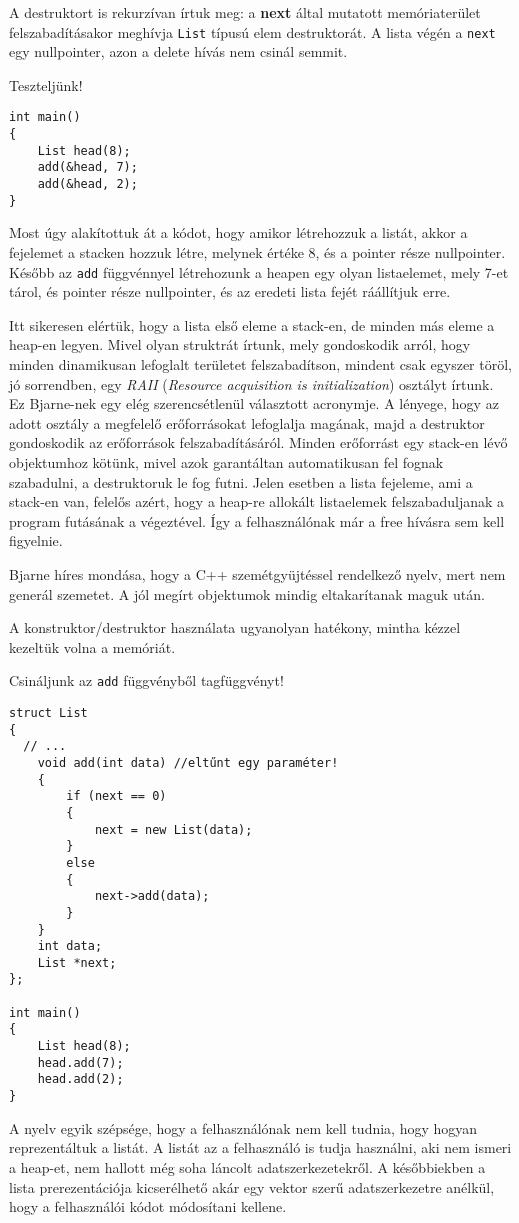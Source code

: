 \documentclass[a4paper,11.5pt,table]{article}
\begin{document}
	\medskip
	A destruktort is rekurzívan írtuk meg: a \textbf{next} által mutatott memóriaterület felszabadításakor meghívja \texttt{List} típusú elem destruktorát. A lista végén a \texttt{next} egy nullpointer, azon a delete hívás nem csinál semmit.
	
	\medskip
	Teszteljünk!
	\begin{lstlisting}
int main()
{
	List head(8);
	add(&head, 7);
	add(&head, 2);
}
	\end{lstlisting}
	Most úgy alakítottuk át a kódot, hogy amikor létrehozzuk a listát, akkor a fejelemet a stacken hozzuk létre, melynek értéke 8, és a pointer része nullpointer. Később az \texttt{add} függvénnyel létrehozunk a heapen egy olyan listaelemet, mely 7-et tárol, és pointer része nullpointer, és az eredeti lista fejét ráállítjuk erre.
	\medskip
	
	Itt sikeresen elértük, hogy a lista első eleme a stack-en, de minden más eleme a heap-en legyen. Mivel olyan struktrát írtunk, mely gondoskodik arról, hogy minden dinamikusan lefoglalt területet felszabadítson, mindent csak egyszer töröl, jó sorrendben, egy  \textit{RAII} (\textit{Resource acquisition is initialization}) osztályt írtunk. Ez Bjarne-nek egy elég szerencsétlenül választott acronymje. A lényege, hogy az adott osztály a megfelelő erőforrásokat lefoglalja magának, majd a destruktor gondoskodik az erőforrások felszabadításáról. Minden erőforrást egy stack-en lévő objektumhoz kötünk, mivel azok garantáltan automatikusan fel fognak szabadulni, a destruktoruk le fog futni. Jelen esetben a lista fejeleme, ami a stack-en van, felelős azért, hogy a heap-re allokált listaelemek felszabaduljanak a program futásának a végeztével. Így a felhasználónak már a free hívásra sem kell figyelnie.
	
	Bjarne híres mondása, hogy a C++ szemétgyüjtéssel rendelkező nyelv, mert nem generál szemetet. A jól megírt objektumok mindig eltakarítanak maguk után. 
	\medskip
	
	A konstruktor/destruktor használata ugyanolyan hatékony, mintha kézzel kezeltük volna a memóriát.
	
	\medskip
	Csináljunk az \texttt{add} függvényből tagfüggvényt!
	\begin{lstlisting}
struct List
{
  // ...	
	void add(int data) //eltűnt egy paraméter!
	{
		if (next == 0)
		{
			next = new List(data);
		}
		else
		{
			next->add(data);
		}
	}
	int data;
	List *next;
};

int main()
{
	List head(8);
	head.add(7);
	head.add(2);
}
	\end{lstlisting}
	A nyelv egyik szépsége, hogy a felhasználónak nem kell tudnia, hogy hogyan reprezentáltuk a listát. A listát az a felhasználó is tudja használni, aki nem ismeri a heap-et, nem hallott még soha láncolt adatszerkezetekről. A későbbiekben a lista prerezentációja kicserélhető akár egy vektor szerű adatszerkezetre anélkül, hogy a felhasználói kódot módosítani kellene.
	\medskip
	
\end{document}
